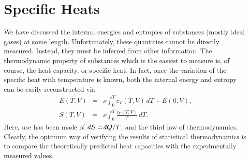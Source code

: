 \section{Specific Heats}
We have discussed the internal energies and entropies of 
substances (mostly ideal gases)
at some length. Unfortunately, these quantities cannot be directly 
measured.
Instead, they must
be inferred from other information. The thermodynamic property of substances which
is the easiest to measure is, of course, the heat capacity, or specific heat. In fact,
once the variation of the specific heat with temperature is known, both the internal
energy and entropy can  be easily  reconstructed via
\begin{eqnarray}
E (T, V) &= &\nu \int_0^T c_V(T, V)\, dT + E(0,V),\\[0.5ex]
S(T, V) &=& \nu \int_0^T \frac{c_V(T,V)}{T} \,dT.\label{e7.126}
\end{eqnarray}
Here, use has been made of $dS = \dbar Q/T$, and the third law of thermodynamics.
Clearly, the optimum way of verifying the results of statistical thermodynamics
is to compare the
theoretically predicted heat capacities with  the experimentally measured values. 

